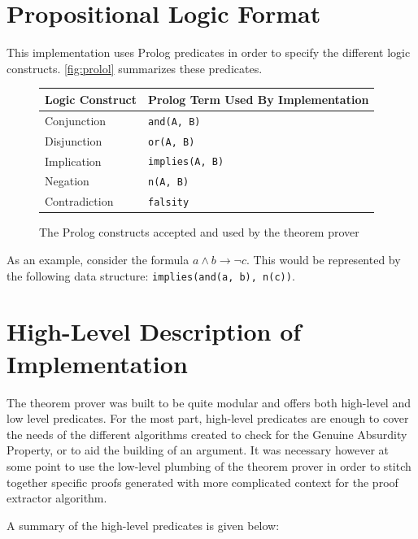 \documentclass[11pt,twoside,a4paper]{report}
\begin{document}
\section{Propositional Logic Format}
This implementation uses Prolog predicates in order to specify the different logic constructs. \autoref{fig:prolol} summarizes these predicates.

\begin{figure}[tph]
\begin{center}
\begin{tabular}{|l|l|}
\hline
Logic Construct & Prolog Term Used By Implementation\\
\hline
Conjunction & \lstinline$and(A, B)$\\
\hline
Disjunction & \lstinline$or(A, B)$\\
\hline
Implication & \lstinline$implies(A, B)$\\
\hline
Negation & \lstinline$n(A, B)$\\
\hline
Contradiction & \lstinline$falsity$\\
\hline
\end{tabular}
\end{center}
\caption{The Prolog constructs accepted and used by the theorem prover\label{fig:prolol}}
\end{figure}

As an example, consider the formula $a\wedge b\rightarrow\neg c$. This would be represented by the following data structure: \lstinline$implies(and(a, b), n(c))$.

\section{High-Level Description of Implementation}
The theorem prover was built to be quite modular and offers both high-level and low level predicates. For the most part, high-level predicates are enough to cover the needs of the different algorithms created to check for the Genuine Absurdity Property, or to aid the building of an argument. It was necessary however at some point to use the low-level plumbing of the theorem prover in order to stitch together specific proofs generated with more complicated context for the proof extractor algorithm.

A summary of the high-level predicates is given below:
\end{document}
